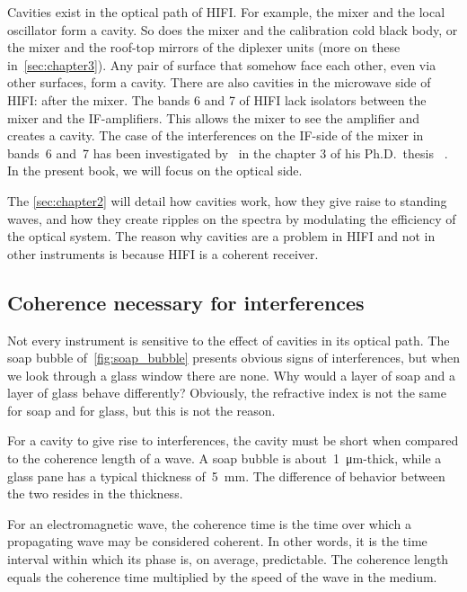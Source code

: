 Cavities exist in the optical path of HIFI.
For example, the mixer and the local oscillator form a cavity.
So does the mixer and the calibration cold black body, or the mixer and the roof-top mirrors of the diplexer units (more on these in~\cref{sec:chapter3}).
Any pair of surface that somehow face each other, even via other surfaces, form a cavity.
There are also cavities in the microwave side of HIFI: after the mixer.
The bands 6 and 7 of HIFI lack isolators between the mixer and the IF-amplifiers.
This allows the mixer to see the amplifier and creates a cavity.
The case of the interferences on the IF-side of the mixer in bands~6 and~7 has been investigated by~\citeauthor{higgins2011} in the chapter 3 of his Ph.D.\ thesis ~\cite{higgins2011}.
In the present book, we will focus on the optical side.

The \cref{sec:chapter2} will detail how cavities work, how they give raise to standing waves, and how they create ripples on the spectra by modulating the efficiency of the optical system.
The reason why cavities are a problem in HIFI and not in other instruments is because HIFI is a coherent receiver.

\subsection{Coherence necessary for interferences}
\label{sec:hifi_is_coherent}

Not every instrument is sensitive to the effect of cavities in its optical path.
The soap bubble of~\cref{fig:soap_bubble} presents obvious signs of interferences, but when we look through a glass window there are none.
Why would a layer of soap and a layer of glass behave differently?
Obviously, the refractive index is not the same for soap and for glass, but this is not the reason.

For a cavity to give rise to interferences, the cavity must be short when compared to the coherence length of a wave.
A soap bubble is about~\SI{1}{\micro\meter}-thick, while a glass pane has a typical thickness of~\SI{5}{\milli\meter}.
The difference of behavior between the two resides in the thickness.

For an electromagnetic wave, the coherence time is the time over which a propagating wave may be considered coherent.
In other words, it is the time interval within which its phase is, on average, predictable.
The coherence length equals the coherence time multiplied by the speed of the wave in the medium.

